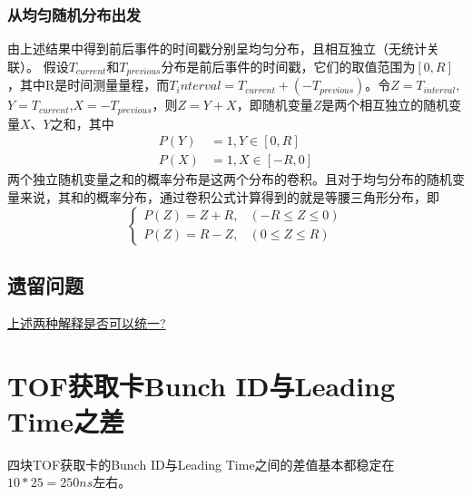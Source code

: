 \subsubsection*{从均匀随机分布出发}
由上述结果中得到前后事件的时间戳分别呈均匀分布，且相互独立（无统计关联）。
假设$T_{current}$和$T_{previous}$分布是前后事件的时间戳，它们的取值范围为$[0,R]$，其中R是时间测量量程，而${T_interval=T_{current}+(-T_{previous})}$。令$Z=T_{interval}$,$Y=T_{current}$,$X=-T_{previous}$，则$Z=Y+X$，即随机变量$Z$是两个相互独立的随机变量$X、Y$之和，其中
\begin{align}
P(Y)&=1, Y\in [0,R]\\
P(X)&=1, X\in [-R,0]
\end{align}
两个独立随机变量之和的概率分布是这两个分布的卷积。且对于均匀分布的随机变量来说，其和的概率分布，通过卷积公式计算得到的就是等腰三角形分布，即
\begin{equation}
	\begin{cases}
	P(Z)=Z+R,&(-R\leq Z \leq 0)\\
	P(Z)=R-Z,&(0\leq Z \leq R)
	\end{cases}
\end{equation}

\subsection{遗留问题}
\underline{上述两种解释是否可以统一?}

\section{TOF获取卡Bunch ID与Leading Time之差}
四块TOF获取卡的Bunch ID与Leading Time之间的差值基本都稳定在$10*25=250ns$左右。

